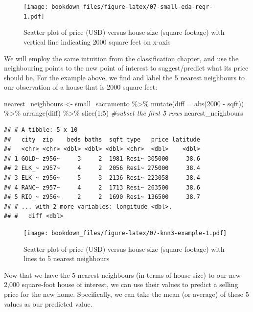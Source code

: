 \documentclass[
]{krantz}
\makeatletter
\newenvironment{Shaded}{\begin{snugshade}}{\end{snugshade}}
\newcommand{\AttributeTok}[1]{\textcolor[rgb]{0.61,0.61,0.61}{#1}}
\newcommand{\CommentTok}[1]{\textcolor[rgb]{0.37,0.37,0.37}{\textit{#1}}}
\newcommand{\DecValTok}[1]{\textcolor[rgb]{0.06,0.06,0.06}{#1}}
\newcommand{\FunctionTok}[1]{\textcolor[rgb]{0,0,0}{#1}}
\newcommand{\NormalTok}[1]{#1}
\newcommand{\OtherTok}[1]{\textcolor[rgb]{0.37,0.37,0.37}{#1}}
\newcommand{\SpecialCharTok}[1]{\textcolor[rgb]{0,0,0}{#1}}
\newenvironment{kframe}{%
\medskip{}
\setlength{\fboxsep}{.8em}
 \def\at@end@of@kframe{}%
 \ifinner\ifhmode%
  \def\at@end@of@kframe{\end{minipage}}%
  \begin{minipage}{\columnwidth}%
 \fi\fi%
 \def\FrameCommand##1{\hskip\@totalleftmargin \hskip-\fboxsep
 \colorbox{shadecolor}{##1}\hskip-\fboxsep
     \hskip-\linewidth \hskip-\@totalleftmargin \hskip\columnwidth}%
 \MakeFramed {\advance\hsize-\width
   \@totalleftmargin\z@ \linewidth\hsize
   \@setminipage}}%
 {\par\unskip\endMakeFramed%
 \at@end@of@kframe}
\renewenvironment{Shaded}{\begin{kframe}}{\end{kframe}}
\makeatother
\begin{document}
\begin{figure}
\centering
\texttt{[image: bookdown\_files/figure-latex/07-small-eda-regr-1.pdf]}
\caption{\label{fig:07-small-eda-regr}Scatter plot of price (USD) versus house size (square footage) with vertical line indicating 2000 square feet on x-axis}
\end{figure}

We will employ the same intuition from the classification chapter, and use the
neighbouring points to the new point of interest to suggest/predict what its
price should be. For the example above, we find and label the 5 nearest
neighbours to our observation of a house that is 2000 square feet:

\begin{Shaded}
\begin{Highlighting}[]
\NormalTok{nearest\_neighbours }\OtherTok{\textless{}{-}}\NormalTok{ small\_sacramento }\SpecialCharTok{\%\textgreater{}\%}
  \FunctionTok{mutate}\NormalTok{(}\AttributeTok{diff =} \FunctionTok{abs}\NormalTok{(}\DecValTok{2000} \SpecialCharTok{{-}}\NormalTok{ sqft)) }\SpecialCharTok{\%\textgreater{}\%}
  \FunctionTok{arrange}\NormalTok{(diff) }\SpecialCharTok{\%\textgreater{}\%}
  \FunctionTok{slice}\NormalTok{(}\DecValTok{1}\SpecialCharTok{:}\DecValTok{5}\NormalTok{) }\CommentTok{\#subset the first 5 rows}
\NormalTok{nearest\_neighbours}
\end{Highlighting}
\end{Shaded}

\begin{verbatim}
## # A tibble: 5 x 10
##   city  zip    beds baths  sqft type   price latitude
##   <chr> <chr> <dbl> <dbl> <dbl> <chr>  <dbl>    <dbl>
## 1 GOLD~ z956~     3     2  1981 Resi~ 305000     38.6
## 2 ELK_~ z957~     4     2  2056 Resi~ 275000     38.4
## 3 ELK_~ z956~     5     3  2136 Resi~ 223058     38.4
## 4 RANC~ z957~     4     2  1713 Resi~ 263500     38.6
## 5 RIO_~ z956~     2     2  1690 Resi~ 136500     38.7
## # ... with 2 more variables: longitude <dbl>,
## #   diff <dbl>
\end{verbatim}

\begin{figure}
\centering
\texttt{[image: bookdown\_files/figure-latex/07-knn3-example-1.pdf]}
\caption{\label{fig:07-knn3-example}Scatter plot of price (USD) versus house size (square footage) with lines to 5 nearest neighbours}
\end{figure}

Now that we have the 5 nearest neighbours (in terms of house size) to our new
2,000 square-foot house of interest, we can use their values to predict a
selling price for the new home. Specifically, we can take the mean (or
average) of these 5 values as our predicted value.
\end{document}
